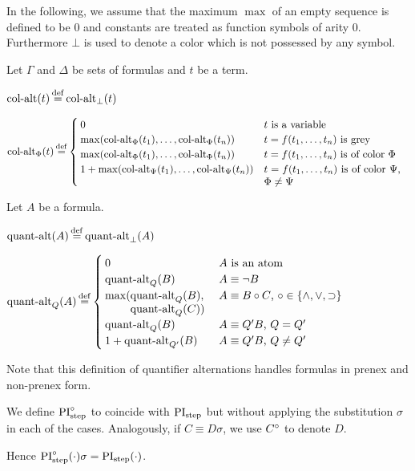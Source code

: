 \documentclass[,%
	draft=false,%
	numbers=noendperiod
	12pt,
	a4paper,
	oneside,%
	openany,
]{memoir}
\begin{document}
In the following, we assume that the maximum $\max$ of an empty sequence is defined to be $0$ and constants are treated as function symbols of arity $0$.
Furthermore $\bot$ is used to denote a color which is not possessed by any symbol.
\begin{defi}
	Let $\Gamma$ and $\Delta$ be sets of formulas and $t$ be a term.

	\medskip

	\noindent
	$\ca(t) \defeq \ca_\bot(t)$
	\medskip

	\noindent
	$
	\ca_\Phi(t) \defeq 
	\begin{cases}
		0 & \text{$t$ is a variable} \\
		\max(\ca_\Phi(t_1), \dots, \ca_\Phi(t_n)) & \text{$t = f(t_1, \dots, t_n)$ is grey} \\
		\max(\ca_\Phi(t_1), \dots, \ca_\Phi(t_n)) & \parbox[t]{0.4\textwidth}{$t = f(t_1, \dots, t_n)$ is of color $\Phi$} \\
		1 + \max(\ca_\Psi(t_1), \dots, \ca_\Psi(t_n)) & \parbox[t]{0.38\textwidth}{$t = f(t_1, \dots, t_n)$ is of color $\Psi$, $\Phi \neq \Psi$} \\
	\end{cases}
	$
\end{defi}


\begin{defi}
	Let $A$ be a formula.\nopagebreak
	\medskip

	\noindent
	$\qa(A) \defeq \qa_\bot(A)$
	\nopagebreak
	\medskip

	\noindent
	$
	\qa_Q(A) \defeq 
	\begin{cases}
		0 & \text{$A$ is an atom} \\
		\qa_Q(B) & \text{$A \equiv \lnot B$} \\
		\max(\parbox[t]{0.2\textwidth}{$\qa_Q(B),$\newline$ \qa_Q(C))$} & \text{$A \equiv B \circ C$, $\circ \in \{\land, \lor, \limpl\}$} \\
		\qa_Q(B) & \text{$A \equiv Q' B$, $Q = Q'$} \\
		1+\qa_{Q'}(B) & \text{$A \equiv Q' B$, $Q \neq Q'$}  \\
	\end{cases}
	$
	\nopagebreak

	\qedhere
\end{defi}
Note that this definition of quantifier alternations handles formulas in prenex and non-prenex form.

\begin{defi}
	We define $\operatorname{PI}^{\circ}_{\mathrm{step}}$ to coincide with $\operatorname{PI}_{\mathrm{step}}$ but without applying the substitution $\sigma$ in each of the cases.
	Analogously, if $C \equiv D\sigma$, we use $C^\circ$ to denote $D$.
\end{defi}
Hence $\operatorname{PI}^{\circ}_{\mathrm{step}}(\cdot) \sigma = \operatorname{PI}_{\mathrm{step}}(\cdot)$.
\end{document}
